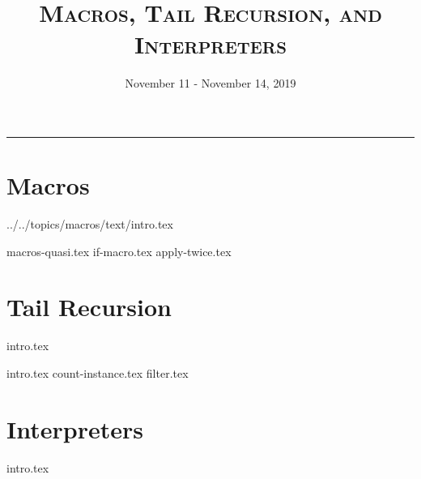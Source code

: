 \documentclass{exam}
\title{\textsc{Macros, Tail Recursion, and Interpreters}}
\date{November 11 - November 14, 2019}
\begin{document}
\maketitle
\rule{\textwidth}{0.15em}
\fontsize{12}{15}\selectfont





\section{Macros}
 {../../topics/macros/text/}{intro.tex}
\begin{questions}
{macros-quasi.tex}
{if-macro.tex}
{apply-twice.tex}
\end{questions}

\newpage
\section{Tail Recursion}
{intro.tex}
\begin{questions}
{intro.tex}
{count-instance.tex}
{filter.tex}
\end{questions}

\section{Interpreters}
\begin{questions}
{intro.tex}
\end{questions}

\end{document}

